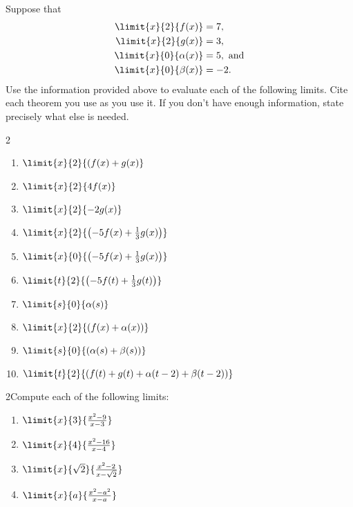 \begin{ProblemSection}
  \begin{embeddedproblem}{}
    Suppose that
    \begin{align*}
      \limit{x}{2}{f(x)}&=7, \\
      \limit{x}{2}{g(x)}&=3, \\
      \limit{x}{0}{\alpha(x)}&=5, \text{ and} \\
      \limit{x}{0}{\beta(x)}&=-2.
    \end{align*}
    Use the information provided above to evaluate each of the
    following limits. Cite each theorem you use as you use it. If you
    don't have enough information, state precisely what else is
    needed.
    \begin{multicols}{2}
      \begin{enumerate}[label={\bf{}(\alph*)}]
      \item $\limit{x}{2}{(f(x)+g(x)}$
      \item $\limit{x}{2}{4f(x)}$
      \item $\limit{x}{2}{-2g(x)}$
      \item $\limit{x}{2}{\left(-5f(x)+\frac13g(x)\right)}$
      \item $\limit{x}{0}{\left(-5f(x)+\frac13g(x)\right)}$
      \item $\limit{t}{2}{\left(-5f(t)+\frac13g(t)\right)}$
      \item $\limit{s}{0}{\alpha(s)}$
      \item $\limit{x}{2}{\left(f(x)+\alpha(x)\right)}$
      \item $\limit{s}{0}{\left(\alpha(s)+\beta(s)\right)}$
      \item $\limit{t}{2}{\left(f(t)+g(t)+\alpha(t-2)+\beta(t-2)\right)}$
      \end{enumerate}
    \end{multicols}
  \end{embeddedproblem}
  \begin{embeddedproblem}{}
    \begin{multicols}{2}{Compute each of the following limits:}
      \begin{enumerate}[label={\bf{}(\alph*)}]
        \item $\limit{x}{3}{\frac{x^2-9}{x-3}}$
        \item $\limit{x}{4}{\frac{x^2-16}{x-4}}$
        \item $\limit{x}{\sqrt{2}}{\frac{x^2-2}{x-\sqrt{2}}}$
        \item $\limit{x}{a}{\frac{x^2-a^2}{x-a}}$
        \end{enumerate}
      \end{multicols}
    \end{embeddedproblem}
    

\end{ProblemSection}
